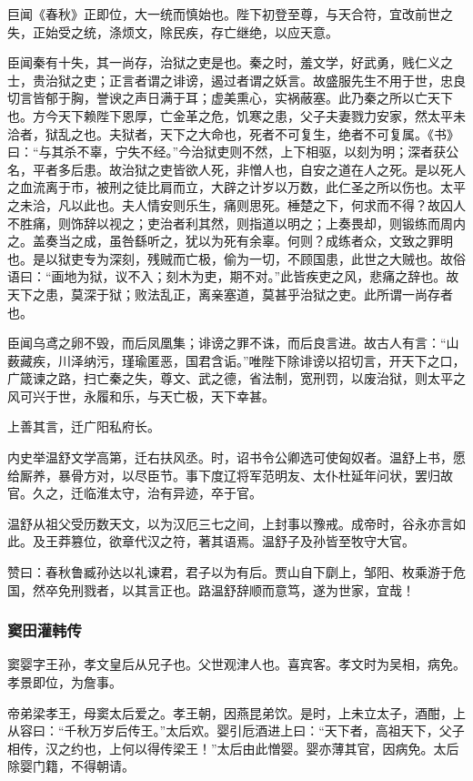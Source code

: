 \documentclass[]{article}
\begin{document}
巨闻《春秋》正即位，大一统而慎始也。陛下初登至尊，与天合符，宜改前世之失，正始受之统，涤烦文，除民疾，存亡继绝，以应天意。

臣闻秦有十失，其一尚存，治狱之吏是也。秦之时，羞文学，好武勇，贱仁义之士，贵治狱之吏；正言者谓之诽谤，遏过者谓之妖言。故盛服先生不用于世，忠良切言皆郁于胸，誉谀之声日满于耳；虚美熏心，实祸蔽塞。此乃秦之所以亡天下也。方今天下赖陛下恩厚，亡金革之危，饥寒之患，父子夫妻戮力安家，然太平未洽者，狱乱之也。夫狱者，天下之大命也，死者不可复生，绝者不可复属。《书》曰：``与其杀不辜，宁失不经。''今治狱吏则不然，上下相驱，以刻为明；深者获公名，平者多后患。故治狱之吏皆欲人死，非憎人也，自安之道在人之死。是以死人之血流离于市，被刑之徒比肩而立，大辟之计岁以万数，此仁圣之所以伤也。太平之未洽，凡以此也。夫人情安则乐生，痛则思死。棰楚之下，何求而不得？故囚人不胜痛，则饰辞以视之；吏治者利其然，则指道以明之；上奏畏却，则锻练而周内之。盖奏当之成，虽咎繇听之，犹以为死有余辜。何则？成练者众，文致之罪明也。是以狱吏专为深刻，残贼而亡极，偷为一切，不顾国患，此世之大贼也。故俗语曰：``画地为狱，议不入；刻木为吏，期不对。''此皆疾吏之风，悲痛之辞也。故天下之患，莫深于狱；败法乱正，离亲塞道，莫甚乎治狱之吏。此所谓一尚存者也。

臣闻乌鸢之卵不毁，而后凤凰集；诽谤之罪不诛，而后良言进。故古人有言：``山薮藏疾，川泽纳污，瑾瑜匿恶，国君含诟。''唯陛下除诽谤以招切言，开天下之口，广箴谏之路，扫亡秦之失，尊文、武之德，省法制，宽刑罚，以废治狱，则太平之风可兴于世，永履和乐，与天亡极，天下幸甚。

上善其言，迁广阳私府长。

内史举温舒文学高第，迁右扶风丞。时，诏书令公卿选可使匈奴者。温舒上书，愿给厮养，暴骨方对，以尽臣节。事下度辽将军范明友、太仆杜延年问状，罢归故官。久之，迁临淮太守，治有异迹，卒于官。

温舒从祖父受历数天文，以为汉厄三七之间，上封事以豫戒。成帝时，谷永亦言如此。及王莽篡位，欲章代汉之符，著其语焉。温舒子及孙皆至牧守大官。

赞曰：春秋鲁臧孙达以礼谏君，君子以为有后。贾山自下劘上，邹阳、枚乘游于危国，然卒免刑戮者，以其言正也。路温舒辞顺而意笃，遂为世家，宜哉！

\hypertarget{header-n4296}{%
\subsubsection{窦田灌韩传}\label{header-n4296}}

窦婴字王孙，孝文皇后从兄子也。父世观津人也。喜宾客。孝文时为吴相，病免。孝景即位，为詹事。

帝弟梁孝王，母窦太后爱之。孝王朝，因燕昆弟饮。是时，上未立太子，酒酣，上从容曰：``千秋万岁后传王。''太后欢。婴引卮酒进上曰：``天下者，高祖天下，父子相传，汉之约也，上何以得传梁王！''太后由此憎婴。婴亦薄其官，因病免。太后除婴门籍，不得朝请。
\end{document}
